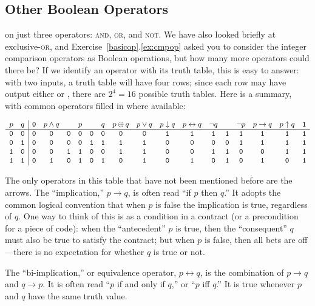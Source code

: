 \subsection{Other Boolean Operators}\label{ssec:OtherBooleanOps}
 on just three operators: \textsc{and}, \textsc{or}, and \textsc{not}. We have also looked briefly at exclusive-\textsc{or}, and Exercise~\ref{basicop}.\ref{ex:cmpop} asked you to consider the integer comparison operators as Boolean operations, but how many more operators could there be? If we identify an operator with its truth table, this is easy to answer: with two inputs, a truth table will have four rows; since each row may have output either \0 or \1, there are $2^4=16$ possible truth tables. Here is a summary, with common operators filled in where available:
\begin{fullwidth}
\[ \begin{array}{cc|cccccccccccccccc}
p & q & \mathtt{0} & p\land q & & p & & q & p\oplus q & p\lor q & p\downarrow q & p\leftrightarrow q &
\lnot q & & \lnot p & p\rightarrow q & p\uparrow q & \mathtt{1}\\ \hline
\mathtt{0} & \mathtt{0} & \mathtt{0} & \mathtt{0} & \mathtt{0} & \mathtt{0} & \mathtt{0} & \mathtt{0} & \mathtt{0} & \mathtt{0} & \mathtt{1} & \mathtt{1} & \mathtt{1} & \mathtt{1} & \mathtt{1} & \mathtt{1} & \mathtt{1} & \mathtt{1}\\
\mathtt{0} & \mathtt{1} & \mathtt{0} & \mathtt{0} & \mathtt{0} & \mathtt{0} & \mathtt{1} & \mathtt{1} & \mathtt{1} & \mathtt{1} & \mathtt{0} & \mathtt{0} & \mathtt{0} & \mathtt{0} & \mathtt{1} & \mathtt{1} & \mathtt{1} & \mathtt{1}\\
\mathtt{1} & \mathtt{0} & \mathtt{0} & \mathtt{0} & \mathtt{1} & \mathtt{1} & \mathtt{0} & \mathtt{0} & \mathtt{1} & \mathtt{1} & \mathtt{0} & \mathtt{0} & \mathtt{1} & \mathtt{1} & \mathtt{0} & \mathtt{0} & \mathtt{1} & \mathtt{1}\\
\mathtt{1} & \mathtt{1} & \mathtt{0} & \mathtt{1} & \mathtt{0} & \mathtt{1} & \mathtt{0} & \mathtt{1} & \mathtt{0} & \mathtt{1} & \mathtt{0} & \mathtt{1} & \mathtt{0} & \mathtt{1} & \mathtt{0} & \mathtt{1} & \mathtt{0} & \mathtt{1}
\end{array} \]
\end{fullwidth}

The only operators in this table that have not been mentioned before are the arrows. The ``implication,'' $p\rightarrow q$, is often read ``if $p$ then $q$.'' It adopts the common logical convention that when $p$ is false the implication is true, regardless of $q$. One way to think of this is as a condition in a contract (or a precondition for a piece of code): when the ``antecedent'' $p$ is true, then the ``consequent'' $q$ must also be true to satisfy the contract; but when $p$ is false, then all bets are off---there is no expectation for whether $q$ is true or not.

The ``bi-implication,'' or equivalence operator, $p\leftrightarrow q$, is the combination of $p\rightarrow q$ and $q\rightarrow p$. It is often read ``$p$ if and only if $q$,'' or ``$p$ iff $q$.'' It is true whenever $p$ and $q$ have the same truth value.

